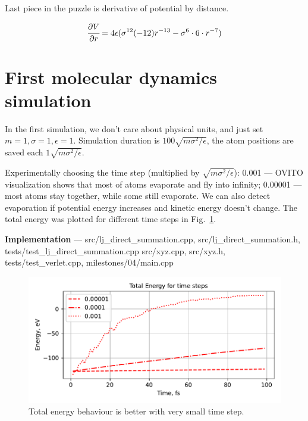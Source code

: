\documentclass[11pt,a4paper]{article}
\newcommand{\mat}[1]{\overline{#1}}
\newcommand{\framed}[1]{\tikz[baseline=(char.base)]{\node[shape=rectangle,draw,inner sep=4pt] (char) {#1};}}
\begin{document}
{\centering\framed{ \( \mat{f}_k = - \sum_i \cfrac{\partial V}{\partial r} {\hat r_{ik}} \) }\\}

Last piece in the puzzle is derivative of potential by distance.

\[
\cfrac{\partial V}{\partial r} = 4\epsilon (\sigma^{12} (-12) r^{-13} - \sigma^6\cdot 6\cdot r^{-7})
\]

\section*{First molecular dynamics simulation}
In the first simulation, we don't care about physical units, and just set \( m=1, \sigma=1, \epsilon=1 \). Simulation duration is \( 100 \sqrt{m\sigma^2 / \epsilon} \), the atom positions are saved each \( 1 \sqrt{m\sigma^2 / \epsilon} \).  

Experimentally choosing the time step (multiplied by \( \sqrt{m\sigma^2 / \epsilon} \)): 0.001 --- OVITO visualization shows that most of atoms evaporate and fly into infinity; 0.00001 --- most atoms stay together, while some still evaporate. We can also detect evaporation if potential energy increases and kinetic energy doesn't change. The total energy was plotted for different time steps in Fig.~\ref{fig:first_simulation}.

{\bf Implementation} --- src/lj\_direct\_summation.cpp, src/lj\_direct\_summation.h, tests/test\_lj\_direct\_summation.cpp src/xyz.cpp, src/xyz.h, tests/test\_verlet.cpp, milestones/04/main.cpp

\begin{figure}[htb]
	\centering
	\includegraphics[width=.7\linewidth]{img/fig.pdf}
	\caption{Total energy behaviour is better with very small time step.}
	\label{fig:first_simulation}
\end{figure}
\end{document}
